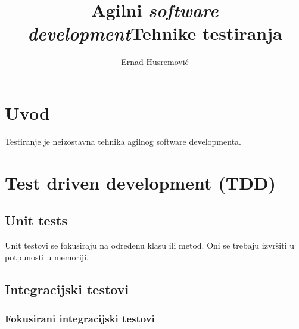 \documentclass[times, utf8, seminar]{fit}
\begin{document}
\setlength{\parindent}{0pt}


\title{Agilni \emph{software development}\newline Tehnike testiranja}

\author{Ernad Husremović}

\maketitle

\tableofcontents

\newpage

%
%


\chapter{Uvod}
\vspace*{-0.7cm}

Testiranje je neizostavna tehnika agilnog software developmenta.

\chapter{Test driven development (TDD)}

\section{Unit tests}

Unit testovi se fokusiraju na određenu klasu ili metod. Oni se trebaju izvršiti u potpunosti u memoriji.\citep[str. 300]{agileart}

\section{Integracijski testovi}

\subsection{Fokusirani integracijski testovi}
\end{document}
